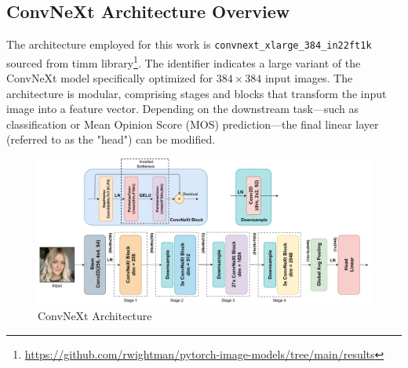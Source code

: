 \documentclass[a4paper,12pt,openright]{book}
\begin{document}
\subsection{ConvNeXt Architecture Overview}
The architecture employed for this work is \texttt{convnext\_xlarge\_384\_in22ft1k} sourced from timm library\footnote{\label{timm}\url{https://github.com/rwightman/pytorch-image-models/tree/main/results}}. The identifier indicates a large variant of the ConvNeXt model specifically optimized for \(384 \times 384\) input images. The architecture is modular, comprising stages and blocks that transform the input image into a feature vector. Depending on the downstream task—such as classification or Mean Opinion Score (MOS) prediction—the final linear layer (referred to as the "head") can be modified.

\begin{figure}[h]
\centering
\includegraphics[width=1.2\textwidth]{images/convok.drawio (1).pdf}
\caption{ConvNeXt Architecture}
\label{fig:convnext}
\end{figure}
\end{document}
